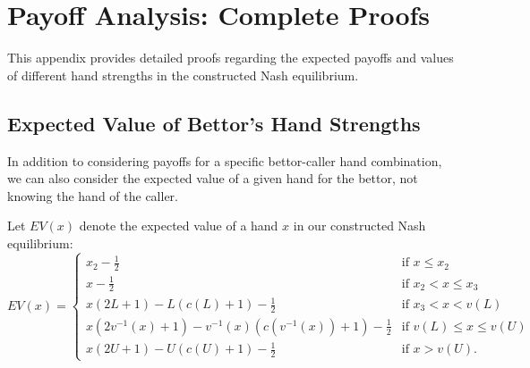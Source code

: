 \documentclass[../../main/main.tex]{subfiles}
\begin{document}
\section{Payoff Analysis: Complete Proofs}
\label{sec:payoff_analysis}

This appendix provides detailed proofs regarding the expected payoffs and values of different hand strengths in the constructed Nash equilibrium.

\subsection{Expected Value of Bettor's Hand Strengths}

In addition to considering payoffs for a specific bettor-caller hand combination, we can also consider the expected value of a given hand for the bettor, not knowing the hand of the caller.

\begin{theorem}
    \label{thm:ev_bettor}
    Let $EV(x)$ denote the expected value of a hand $x$ in our constructed Nash equilibrium:
    \begin{equation}
        EV(x) = \begin{cases}
            x_2-\frac{1}{2} & \text{if } x \leq x_2 \\
            x-\frac{1}{2} & \text{if } x_2 < x \le x_3 \\
            x(2L + 1) - L(c(L) + 1) - \frac{1}{2} & \text{if } x_3 < x < v(L) \\
            x(2v^{-1}(x) + 1) - v^{-1}(x)(c(v^{-1}(x)) + 1) - \frac{1}{2} & \text{if } v(L) \leq x \leq v(U) \\
            x(2U + 1) - U(c(U) + 1) - \frac{1}{2} & \text{if } x > v(U).
        \end{cases}
    \end{equation}
\end{theorem}
\end{document}
